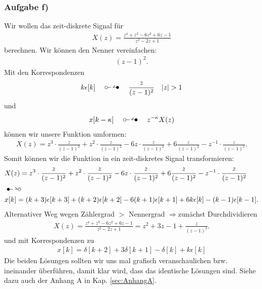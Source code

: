 \documentclass[11pt,a4paper,DIV=12]{scrartcl}
\begin{document}
\subsubsection{Aufgabe f)}
\label{sec:taskf1}
Wir wollen das zeit-diskrete Signal für
\begin{align}
	X(z)=\frac{z^4+z^3-6z^2+6z-1}{z^2-2z+1}
\end{align}
berechnen.
Wir können den Nenner vereinfachen:
\begin{align}
	(z-1)^2.
\end{align}
Mit den Korrespondenzen
\begin{align}
	k\epsilon[k]\quad\ztransf\quad\frac{z}{(z-1)^2}\quad |z|>1
\end{align}
und
\begin{align}
	x[k-\kappa]\quad\ztransf\quad z^{-\kappa}X(z)
\end{align}
können wir unsere Funktion umformen:
\begin{align}
	X(z)=z^3\cdot\frac{z}{(z-1)^2}+z^2\cdot\frac{z}{(z-1)^2}-6z\cdot\frac{z}{(z-1)^2}+6\frac{z}{(z-1)^2}-z^{-1}\cdot\frac{z}{(z-1)^2}.
\end{align}
Somit können wir die Funktion in ein zeit-diskretes Signal transformieren:
\begin{align}
	&X(z)=z^3\cdot\frac{z}{(z-1)^2}+z^2\cdot\frac{z}{(z-1)^2}-6z\cdot\frac{z}{(z-1)^2}+6\frac{z}{(z-1)^2}-z^{-1}\cdot\frac{z}{(z-1)^2} \nonumber\\
	&\Ztransf \nonumber\\
	&x[k]=(k+3)\epsilon[k+3]+(k+2)\epsilon[k+2]-6(k+1)\epsilon[k+1]+6k\epsilon[k]-(k-1)\epsilon[k-1].
\end{align}
%
%
Alternativer Weg wegen Zählergrad $>$ Nennergrad \quad $\Rightarrow$\quad zunächst
Durchdividieren
\begin{align}
X(z) = \frac{z^4 + z^3 -6z^2 + 6z -1}{z^2-2z+1} = z^2 + 3 z - 1 + \frac{z}{(z-1)^2}.
\end{align}%
und mit Korrespondenzen zu
\begin{align}
x[k] = \delta[k+2] +3 \delta[k+1] -\delta[k] +k\epsilon[k]
\end{align}
%
Die beiden Lösungen sollten wir uns mal grafisch veranschaulichen bzw. ineinander
überführen, damit klar wird, dass das identische Lösungen sind. Siehe dazu auch
der Anhang A in Kap. \ref{sec:AnhangA}.
\end{document}
